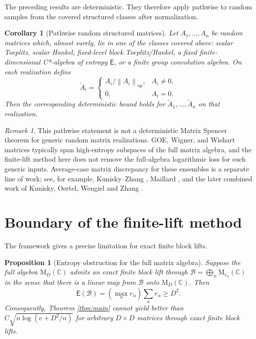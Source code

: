\documentclass[11pt]{amsart}
\numberwithin{equation}{section}
\newtheorem{proposition}[theorem]{Proposition}
\newtheorem{corollary}[theorem]{Corollary}
\theoremstyle{definition}
\theoremstyle{remark}
\newtheorem{remark}[theorem]{Remark}
\newcommand{\C}{\mathbb C}
\newcommand{\M}{\mathrm M}
\newcommand{\op}{\mathrm{op}}
\newcommand{\Ent}{\mathsf E}
\newcommand{\norm}[1]{\left\lVert #1\right\rVert}
\newcommand{\mcB}{\mathcal B}
\begin{document}
The preceding results are deterministic. They therefore apply pathwise to
random samples from the covered structured classes after normalization.

\begin{corollary}[Pathwise random structured matrices]
Let $A_1,\ldots,A_n$ be random matrices which, almost surely, lie in one of the
classes covered above: scalar Toeplitz, scalar Hankel, fixed-level block
Toeplitz/Hankel, a fixed finite-dimensional C*-algebra of entropy $\Ent$, or a
finite group convolution algebra. On each realization define
\[
\widetilde A_i=
\begin{cases}
A_i/\norm{A_i}_{\op},& A_i\ne0,\\
0,& A_i=0.
\end{cases}
\]
Then the corresponding deterministic bound holds for
$\widetilde A_1,\ldots,\widetilde A_n$ on that realization.
\end{corollary}

\begin{remark}
This pathwise statement is not a deterministic Matrix Spencer theorem for
generic random matrix realizations. GOE, Wigner, and Wishart matrices typically
span high-entropy subspaces of the full matrix algebra, and the finite-lift
method here does not remove the full-algebra logarithmic loss for such generic
inputs. Average-case matrix discrepancy for these ensembles is a separate line
of work; see, for example, Kunisky--Zhang \cite{KuniskyZhang}, Maillard
\cite{Maillard}, and the later combined work of Kunisky, Oertel, Wengiel and
Zhang \cite{KOWZ}.
\end{remark}

\section{Boundary of the finite-lift method}

The framework gives a precise limitation for exact finite block lifts.

\begin{proposition}[Entropy obstruction for the full matrix algebra]\label{prop:obstruct}
Suppose the full algebra $\M_D(\C)$ admits an exact finite block lift through
$\mcB=\bigoplus_\alpha\M_{r_\alpha}(\C)$ in the sense that there is a linear map
from $\mcB$ onto $\M_D(\C)$. Then
\[
\Ent(\mcB)
=\left(\max_\alpha r_\alpha\right)\sum_\alpha r_\alpha
\ge D^2 .
\]
Consequently, Theorem \ref{thm:main} cannot yield better than
$C\sqrt{n\log(e+D^2/n)}$ for arbitrary $D\times D$ matrices through exact finite
block lifts.
\end{proposition}
\end{document}
